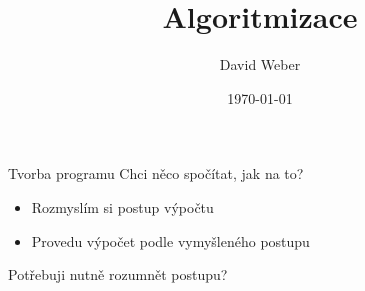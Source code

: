 \documentclass[11pt,aspectratio=169]{beamer}
\title{Algoritmizace}
\author{David Weber}
\date{\today}
\begin{document}

    \begin{frame}
        \titlepage
    \end{frame}

    \begin{frame}{Tvorba programu}
        Chci něco spočítat, jak na to?
        \begin{itemize}
            \item Rozmyslím si postup výpočtu
            \item Provedu výpočet podle vymyšleného postupu
        \end{itemize}
        Potřebuji nutně rozumnět postupu?
        \begin{center}
        \end{center}
    \end{frame}
\end{document}
